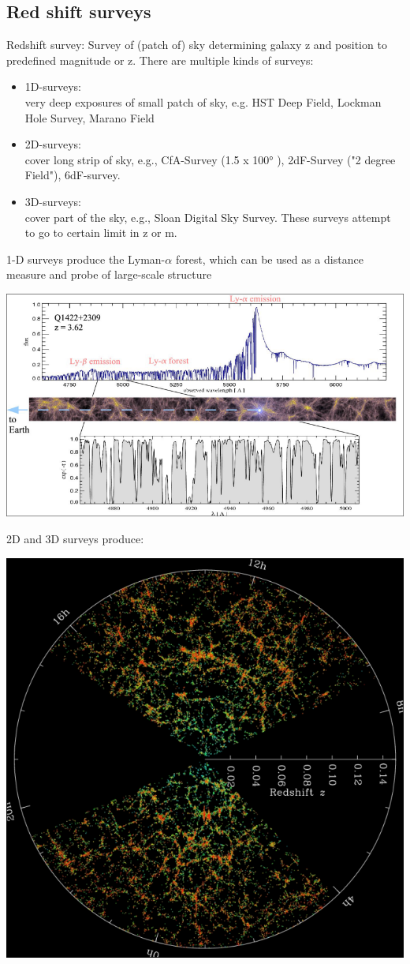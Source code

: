 \documentclass[11pt,a4paper]{article}
\begin{document}
\subsection{Red shift surveys}
Redshift survey: Survey of (patch of) sky determining galaxy z and position to predefined magnitude or z.
There are multiple kinds of surveys:
\begin{itemize}
    \item 1D-surveys: \\ very deep exposures of small patch of sky, e.g. HST Deep Field,
Lockman Hole Survey, Marano Field 
\item 2D-surveys:\\ cover long strip of sky, e.g., CfA-Survey (1.5 x 100°
), 2dF-Survey
("2 degree Field"), 6dF-survey.
\item 3D-surveys: \\ cover part of the sky, e.g., Sloan Digital Sky Survey.
These surveys attempt to go to certain limit in z or m.
\end{itemize}
1-D surveys produce the Lyman-$\alpha$ forest, which can be used as a distance measure and probe of large-scale structure
\begin{center}
    \includegraphics[width=0.9\linewidth]{screenshot_2024-01-27-141853.png}
\end{center}
2D and 3D surveys produce:

\begin{center}
    \includegraphics[width=0.6\linewidth]{screenshot_2024-01-27-142215.png}
\end{center}
\end{document}
